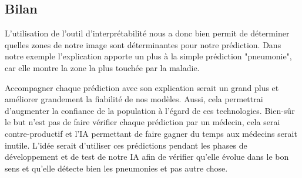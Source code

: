 \subsection{Bilan}
L'utilisation de l'outil d'interprétabilité nous a donc bien permit de déterminer quelles zones de notre image sont déterminantes pour notre prédiction. Dans notre exemple l'explication apporte un plus à la simple prédiction "pneumonie", car elle montre la zone la plus touchée par la maladie.\par
Accompagner chaque prédiction avec son explication serait un grand plus et améliorer grandement la fiabilité de nos modèles. Aussi, cela permettrai d'augmenter la confiance de la population à l'égard de ces technologies. Bien-sûr le but n'est pas de faire vérifier chaque prédiction par un médecin, cela serai contre-productif et l'IA permettant de faire gagner du temps aux médecins serait inutile. L'idée serait d'utiliser ces prédictions pendant les phases de développement et de test de notre IA afin de vérifier qu'elle évolue dans le bon sens et qu'elle détecte bien les pneumonies et pas autre chose.